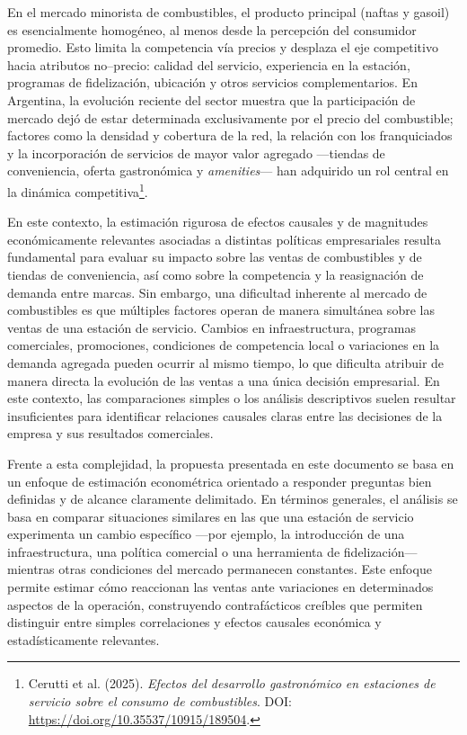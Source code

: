 \documentclass[12pt]{article}
\begin{document}
En el mercado minorista de combustibles, el producto principal (naftas y gasoil) es esencialmente homogéneo, al menos desde la percepción del consumidor promedio. Esto limita la competencia vía precios y desplaza el eje competitivo hacia atributos no--precio: calidad del servicio, experiencia en la estación, programas de fidelización, ubicación y otros servicios complementarios. En Argentina, la evolución reciente del sector muestra que la participación de mercado dejó de estar determinada exclusivamente por el precio del combustible; factores como la densidad y cobertura de la red, la relación con los franquiciados y la incorporación de servicios de mayor valor agregado —tiendas de conveniencia, oferta gastronómica y \emph{amenities}— han adquirido un rol central en la dinámica competitiva\footnote{Cerutti et al. (2025). \emph{Efectos del desarrollo gastronómico en estaciones de servicio sobre el consumo de combustibles}. DOI: \url{https://doi.org/10.35537/10915/189504}.}. 

En este contexto, la estimación rigurosa de efectos causales y de magnitudes económicamente relevantes asociadas a distintas políticas empresariales resulta fundamental para evaluar su impacto sobre las ventas de combustibles y de tiendas de conveniencia, así como sobre la competencia y la reasignación de demanda entre marcas. Sin embargo, una dificultad inherente al mercado de combustibles es que múltiples factores operan de manera simultánea sobre las ventas de una estación de servicio. Cambios en infraestructura, programas comerciales, promociones, condiciones de competencia local o variaciones en la demanda agregada pueden ocurrir al mismo tiempo, lo que dificulta atribuir de manera directa la evolución de las ventas a una única decisión empresarial. En este contexto, las comparaciones simples o los análisis descriptivos suelen resultar insuficientes para identificar relaciones causales claras entre las decisiones de la empresa y sus resultados comerciales.

Frente a esta complejidad, la propuesta presentada en este documento se basa en un enfoque de estimación econométrica orientado a responder preguntas bien definidas y de alcance claramente delimitado. En términos generales, el análisis se basa en comparar situaciones similares en las que una estación de servicio experimenta un cambio específico —por ejemplo, la introducción de una infraestructura, una política comercial o una herramienta de fidelización— mientras otras condiciones del mercado permanecen constantes. Este enfoque permite estimar cómo reaccionan las ventas ante variaciones en determinados aspectos de la operación, construyendo contrafácticos creíbles que permiten distinguir entre simples correlaciones y efectos causales económica y estadísticamente relevantes.
\end{document}
